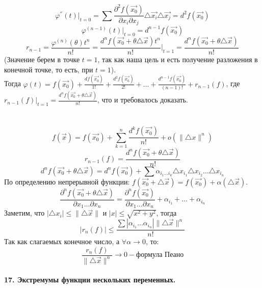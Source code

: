 \documentclass[12pt]{article}
\begin{document}
$$\varphi^{''}(t)|_{t=0}=\sum \frac{\partial^2 f (\overrightarrow{x_0})}{\partial x_i \partial x_j}{\bigtriangleup \overrightarrow{x_i}}{\bigtriangleup \overrightarrow{x_j}} = d^2f(\overrightarrow{x_0})$$
$$\varphi^{(n-1)}(t)|_{t=0}=d^{n-1}f(\overrightarrow{x_0})$$
$$r_{n-1} = \frac{\varphi^{(n)}(\theta)t^n}{n!} = \frac{d^n f(\overrightarrow{x_0}+\theta {\bigtriangleup \overrightarrow{x}}) t^n}{n!} |_{t=1} = \frac{d^n f(\overrightarrow{x_0}+\theta {\bigtriangleup \overrightarrow{x}})}{n!}$$
(Значение берем в точке $t=1$, так как наша цель и есть получение разложения в конечной точке, то есть, при $t=1$).\\
Тогда $\varphi (t) =  f(\overrightarrow{x_0})+\frac{df(\overrightarrow{x_0})}{1!}+\frac{d^2 f(\overrightarrow{x_0})}{2!}+\dots+\frac{d^{n-1} f(\overrightarrow{x_0})}{(n-1)!}+r_{n-1}(f)$, где $r_{n-1}(f)|_{t=1} = \frac{d^n f(\overrightarrow{x_0}+\theta {\bigtriangleup \overrightarrow{x}})}{n!}$, что и требовалось доказать.\\
\\
\\
$$f(\overrightarrow{x})=f(\overrightarrow{x_0})+\sum_{k=1}^n \frac{d^k f(\overrightarrow{x_0})}{n!} + o(\| {\bigtriangleup x} \|^n)$$
$$r_{n-1}(f) = \frac{d^n f(\overrightarrow{x_0}+\theta {\bigtriangleup \overrightarrow{x}})}{n!}$$
$$d^n f(\overrightarrow{x_0}+\theta {\bigtriangleup \overrightarrow{x}}) = d^n f(\overrightarrow{x_0})+\sum \alpha_{i_1\dots i_k} {\bigtriangleup x_{i_1}}{\bigtriangleup x_{i_2}}\dots {\bigtriangleup x_{i_n}}$$
По определению непрерывной функции: $f(\overrightarrow{x_0}+{\bigtriangleup \overrightarrow{x}}) = f(\overrightarrow{x_0}) + \alpha ({\bigtriangleup \overrightarrow{x}})$.\\
$$\frac{\partial^n f(\overrightarrow{x_0}+\theta {\bigtriangleup \overrightarrow{x}})}{\partial x_1 \dots \partial x_n} = \frac{\partial^n f(\overrightarrow{x_0})}{\partial x_1 \dots \partial x_n}+\alpha_{i_1} + \dots + \alpha_{i_n}$$
Заметим, что $|{\bigtriangleup x_i}| \leq \| {\bigtriangleup \overrightarrow{x}} \|$ и $|x| \leq \sqrt{x^2 + y^2}$, тогда\\
$$|r_n(f)| \leq \frac{\sum |\alpha_{i_1}\dots \alpha_{i_n}|\| {\bigtriangleup \overrightarrow{x}} \|^n}{n!}$$
Так как слагаемых конечное число, а $\forall \alpha \to 0$, то:\\
$$\frac{r_n(f)}{\| {\bigtriangleup \overrightarrow{x}} \|^n} \to 0 - \text{формула Пеано}$$
\\
\label{question17_1}\textbf{17. Экстремумы функции нескольких переменных.}\\
\end{document}
